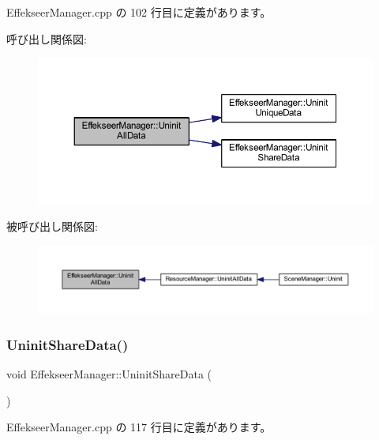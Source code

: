  Effekseer\+Manager.\+cpp の 102 行目に定義があります。

呼び出し関係図\+:
\nopagebreak
\begin{figure}[H]
\begin{center}
\leavevmode
\includegraphics[width=350pt]{class_effekseer_manager_aa9f5c911182097238d979cc628f2dc13_cgraph}
\end{center}
\end{figure}
被呼び出し関係図\+:
\nopagebreak
\begin{figure}[H]
\begin{center}
\leavevmode
\includegraphics[width=350pt]{class_effekseer_manager_aa9f5c911182097238d979cc628f2dc13_icgraph}
\end{center}
\end{figure}
\mbox{\label{class_effekseer_manager_ab83021d09eeeaba41852c8db2f07fe55}} 
\subsubsection{\texorpdfstring{Uninit\+Share\+Data()}{UninitShareData()}}
{\footnotesize\ttfamily void Effekseer\+Manager\+::\+Uninit\+Share\+Data (\begin{DoxyParamCaption}{ }\end{DoxyParamCaption})\hspace{0.3cm}{\ttfamily [static]}}



 Effekseer\+Manager.\+cpp の 117 行目に定義があります。

